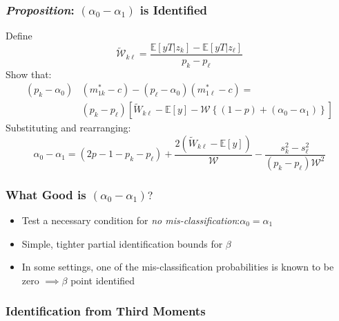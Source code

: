 \documentclass{beamer}
\begin{document}
\begin{frame}
  \frametitle{\emph{Proposition}: $(\alpha_0 - \alpha_1)$ is Identified}
  Define
\begin{equation*}
  \widetilde{\mathcal{W}}_{k\ell} = \frac{\mathbb{E}[yT|z_k] - \mathbb{E}[yT|z_\ell]}{p_k - p_\ell}
\end{equation*}
Show that:
\begin{align*}
(p_k - \alpha_0)&(m^*_{1k}-c) - (p_\ell - \alpha_0)(m^*_{1\ell}-c) =\\
& (p_k - p_\ell)\left[ \widetilde{W}_{k\ell} - \mathbb{E}[y] - \mathcal{W}\left\{ (1 - p) + (\alpha_0 - \alpha_1) \right\} \right]
\end{align*}
Substituting and rearranging: 
\begin{equation*}
  \alpha_0 - \alpha_1 = (2p - 1 - p_k - p_\ell) + \frac{2(\widetilde{W}_{k\ell} - \mathbb{E}[y])}{\mathcal{W}} - \frac{s_k^2 - s_\ell^2}{(p_k - p_\ell)\mathcal{W}^2}
\end{equation*}
\end{frame}
\begin{frame}
  \frametitle{What Good is $(\alpha_0 - \alpha_1)?$}
    \begin{itemize}
      \item Test a necessary condition for \emph{no mis-classification}:$\alpha_0 = \alpha_1$ 
      \item Simple, tighter partial identification bounds for $\beta$
      \item In some settings, one of the mis-classification probabilities is known to be zero $\implies \beta$ point identified 
    \end{itemize}
\end{frame}
\begin{frame}
  \frametitle{Identification from Third Moments}
\end{frame}
\end{document}
